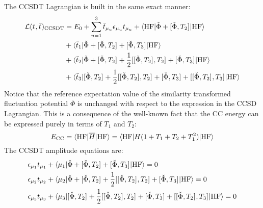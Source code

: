The \acrshort{CCSDT} Lagrangian is built in the same exact manner:
\begin{equation}\label{eq:ccsdt-lagrangian}
 \begin{aligned}
 \mathcal{L}(t_{}, \bar{t}_{})_\mathrm{CCSDT}
&=
 E_0
 + \sum_{u=1}^{3}\bar{t}_{\mu_u}\epsilon_{\mu_u}t_{\mu_u}
 + \braket{\mathrm{HF} | \check{\Phi} + [ \check{\Phi}, T_2 ]^{} | \mathrm{HF}} \\
 &+ \braket{\bar{t}_{1} | \check{\Phi} + [ \check{\Phi}, T_2 ]^{} + [ \check{\Phi}, T_3 ]^{} | \mathrm{HF}} \\
 &+ \braket{\bar{t}_{2} | \check{\Phi} + [ \check{\Phi}, T_2 ]^{}
   +\frac{1}{2}[ [ \check{\Phi}, T_2 ]^{}, T_2 ]^{} + [ \check{\Phi}, T_3 ]^{} | \mathrm{HF}} \\
 &+ \braket{\bar{t}_{3} | [ \check{\Phi}, T_2 ]^{}
   + \frac{1}{2}[ [ \check{\Phi}, T_2 ]^{}, T_2 ]^{} + [ \check{\Phi}, T_3 ]^{}
   + [ [ \check{\Phi}, T_2 ]^{}, T_3 ]^{}
   | \mathrm{HF}}
  \end{aligned}
\end{equation}
Notice that the reference expectation value of the similarity transformed
fluctuation potential $\overline{\Phi}$ is unchanged with respect to the
expression in the \acrshort{CCSD} Lagrangian.
This is a consequence of the well-known fact that the \acrshort{CC} energy can
be expressed purely in terms of $T_1$ and $T_2$:
\begin{equation}
E_\mathrm{CC} = \braket{\mathrm{HF} | \overline{H} | \mathrm{HF}}
=
\braket{\mathrm{HF} | H(1 + T_1 + T_2 + T_1^2) | \mathrm{HF}}
\end{equation}
The \acrshort{CCSDT} amplitude equations are:
\begin{subequations}\label{eq:ccsdt-amplitudes}
  \begin{align}
   \epsilon_{\mu_1}t_{\mu_1} &+ \braket{\mu_1 |
   \check{\Phi} + [ \check{\Phi}, T_2 ]^{} + [ \check{\Phi}, T_3 ]^{}
   | \mathrm{HF}}
             = 0 \label{eq:ccsdt-singles-amplitudes}\\
   \epsilon_{\mu_2}t_{\mu_2} &+ \braket{\mu_2 |
   \check{\Phi} + [ \check{\Phi}, T_2 ]^{}
   + \frac{1}{2}[ [ \check{\Phi}, T_2 ]^{}, T_2 ]^{} + [ \check{\Phi}, T_3 ]^{}
   | \mathrm{HF}}
             = 0 \label{eq:ccsdt-doubles-amplitudes} \\
   \epsilon_{\mu_3}t_{\mu_3} &+ \braket{\mu_3 |
   [ \check{\Phi}, T_2 ]^{}
   + \frac{1}{2}[ [ \check{\Phi}, T_2 ]^{}, T_2 ]^{} + [ \check{\Phi}, T_3 ]^{}
   + [ [ \check{\Phi}, T_2 ]^{}, T_3 ]^{}
   | \mathrm{HF}}
             = 0 \label{eq:ccsdt-triples-amplitudes}
  \end{align}
\end{subequations}
